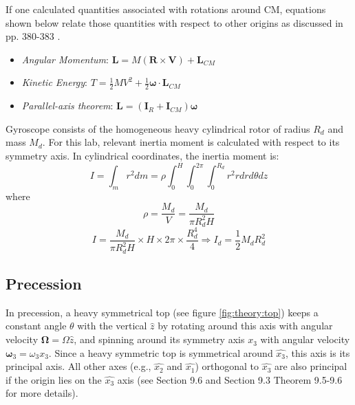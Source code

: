 \begin{multicols}{2}
If one calculated quantities associated with rotations around CM, equations shown below relate those quantities with respect to other origins as discussed in pp. 380-383 \cite{morin}.
\begin{itemize}
\item \emph{Angular Momentum}: $\mathbf{L} = M(\mathbf{R} \times \mathbf{V}) + \mathbf{L}_{CM}$
\item \emph{Kinetic Energy}: $T = \frac{1}{2}MV^2 + \frac{1}{2}\boldsymbol\omega \cdot \mathbf{L}_{CM}$
\item \emph{Parallel-axis theorem}: $\mathbf{L} = \left( \mathbf{I}_{R} + \mathbf{I}_{CM} \right) \boldsymbol\omega$
\end{itemize}

Gyroscope consists of the homogeneous heavy cylindrical rotor of radius $R_{d}$ and mass $M_{d}$. For this lab, relevant inertia moment is calculated with respect to its symmetry axis. In cylindrical coordinates, the inertia moment is:
\begin{equation*}
  I = \int_{m}r^{2}dm = \rho\int_{0}^{H} \int_{0}^{2\pi}\int_{0}^{R_d}r^{2} rdrd\theta dz 
\end{equation*}
where
\begin{equation*}
  \rho = \frac{M_{d}}{V} = \frac{M_{d}}{\pi R_{d}^{2} H}
\end{equation*}
\begin{equation} \label{eq:theory:id}
  I = \frac{M_{d}}{\pi R_{d}^{2} H} \times H \times 2\pi \times \frac{R_{d}^{4}}{4} \Rightarrow I_{d} = \frac{1}{2} M_{d} R_{d}^{2}
\end{equation}

\subsection{Precession}
\label{sec:theory:precession}

In precession, a heavy symmetrical top (see figure \ref{fig:theory:top}) keeps a constant angle $\theta$ with the vertical $\hat{z}$ by rotating around this axis with angular velocity $\boldsymbol\Omega = \Omega \hat{z}$, and spinning around its symmetry axis $\hat{x_{3}}$ with angular velocity $\boldsymbol\omega_{3} = \omega_{3} \hat{x_{3}}$. Since a heavy symmetric top is symmetrical around $\hat{x_{3}}$, this axis is its principal axis. All other axes (e.g., $\hat{x_{2}}$ and $\hat{x_{1}}$) orthogonal to $\hat{x_{3}}$ are also principal if the origin lies on the $\hat{x_{3}}$ axis (see Section 9.6 and Section 9.3 Theorem 9.5-9.6 \cite{morin} for more details).


\end{multicols}
